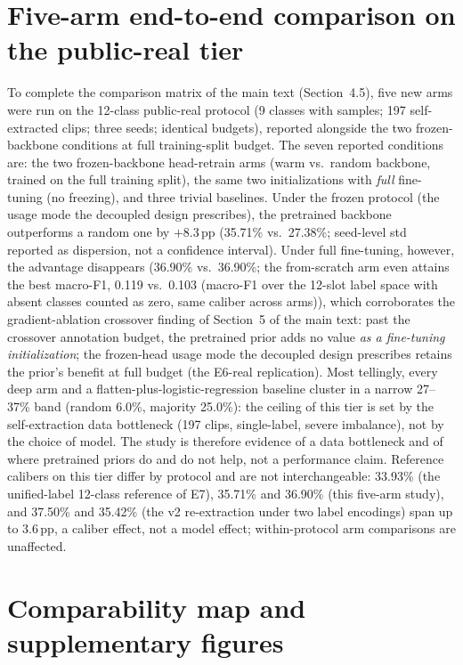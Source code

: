 \documentclass[11pt,a4paper]{article}
\begin{document}
\section{Five-arm end-to-end comparison on the public-real tier}\label{app:fivearm}

To complete the comparison matrix of the main text (Section~4.5), five new arms were run on the 12-class public-real protocol (9 classes with samples; 197 self-extracted clips; three seeds; identical budgets), reported alongside the two frozen-backbone conditions at full training-split budget. The seven reported conditions are: the two frozen-backbone head-retrain arms (warm vs.\ random backbone, trained on the full training split), the same two initializations with \emph{full} fine-tuning (no freezing), and three trivial baselines. Under the frozen protocol (the usage mode the decoupled design prescribes), the pretrained backbone outperforms a random one by $+8.3$\,pp (35.71\% vs.\ 27.38\%; seed-level std reported as dispersion, not a confidence interval). Under full fine-tuning, however, the advantage disappears (36.90\% vs.\ 36.90\%; the from-scratch arm even attains the best macro-F1, 0.119 vs.\ 0.103 (macro-F1 over the 12-slot label space with absent classes counted as zero, same caliber across arms)), which corroborates the gradient-ablation crossover finding of Section~5 of the main text: past the crossover annotation budget, the pretrained prior adds no value \emph{as a fine-tuning initialization}; the frozen-head usage mode the decoupled design prescribes retains the prior's benefit at full budget (the E6-real replication). Most tellingly, every deep arm and a flatten-plus-logistic-regression baseline cluster in a narrow 27--37\% band (random 6.0\%, majority 25.0\%): the ceiling of this tier is set by the self-extraction data bottleneck (197 clips, single-label, severe imbalance), not by the choice of model. The study is therefore evidence of a data bottleneck and of where pretrained priors do and do not help, not a performance claim. Reference calibers on this tier differ by protocol and are not interchangeable: 33.93\% (the unified-label 12-class reference of E7), 35.71\% and 36.90\% (this five-arm study), and 37.50\% and 35.42\% (the v2 re-extraction under two label encodings) span up to 3.6\,pp, a caliber effect, not a model effect; within-protocol arm comparisons are unaffected.

\section{Comparability map and supplementary figures}
\end{document}
